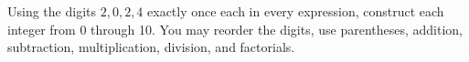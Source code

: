 Using the digits $2,0,2,4$ exactly once each in every expression, construct each integer from 0 through 10. You may reorder the digits, use parentheses, addition, subtraction, multiplication, division, and factorials.
